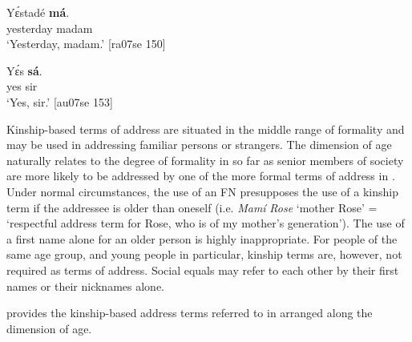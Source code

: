 \ea%
    \label{ex:key:1675}
    \gll Yɛ́stadé    \textbf{má}.\\
yesterday  madam\\

\glt ‘Yesterday, madam.’ [ra07se 150]
\z


\ea%
    \label{ex:key:1676}
    \gll Yɛ́s  \textbf{sá}.\\
yes  sir\\

\glt ‘Yes, sir.’ [au07se 153]
\z

Kinship-based terms of address are situated in the middle range of formality and may be used in addressing familiar persons or strangers. The dimension of age naturally relates to the degree of formality in so far as senior members of society are more likely to be addressed by one of the more formal terms of address in . Under normal circumstances, the use of an FN presupposes the use of a kinship term if the addressee is older than oneself (i.e. \textit{Mamí} \textit{Rose} ‘mother Rose’ = ‘respectful address term for Rose, who is of my mother’s generation’). The use of a first name alone for an older person is highly inappropriate. For people of the same age group, and young people in particular, kinship terms are, however, not required as terms of address. Social equals may refer to each other by their first names or their nicknames alone.


  provides the kinship-based address terms referred to in  arranged along the dimension of age.


